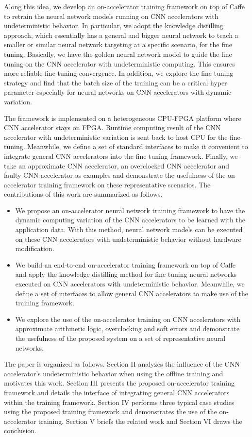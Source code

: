 Along this idea, we develop an on-accelerator training framework 
on top of Caffe to retrain the neural network models 
running on CNN accelerators with undeterministic behavior. 
In particular, we adopt the knowledge 
distilling approach, which essentially has a general and bigger
neural network to teach a smaller or similar neural network 
targeting at a specific scenario, for the fine tuning. 
Basically, we have the golden neural network model 
to guide the fine tuning on the CNN accelerator with undeterministic 
computing. This ensures more reliable fine tuning convergence.  
In addition, we explore the fine tuning strategy and find 
that the batch size of the training can be a critical hyper parameter 
especially for neural networks on CNN accelerators with dynamic variation. 

The framework is implemented on a heterogeneous CPU-FPGA platform where 
CNN accelerator stays on FPGA. Runtime computing result of the 
CNN accelerator with undeterministic variation is sent back to 
host CPU for the fine-tuning. Meanwhile, we define a set of standard 
interfaces to make it convenient to integrate general CNN accelerators 
into the fine tuning framework. Finally, we take an approximate CNN accelerator,
an overclocked CNN accelerator and faulty CNN accelerator as examples 
and demonstrate the usefulness of the on-accelerator training framework on 
these representative scenarios. The contributions of this work are 
summarized as follows.

\begin{itemize}
	\item We propose an on-accelerator neural network training framework to 
		have the dynamic computing variation of the CNN accelerators to be 
		learned with the application data. With this method, neural 
		network models can be executed on these CNN accelerators with 
		undeterministic behavior without hardware modification.

	\item We build an end-to-end on-accelerator training framework on top of Caffe
		and apply the knowledge distilling method for fine tuning neural networks 
		executed on CNN accelerators with undeterministic behavior. Meanwhile, we 
		define a set of interfaces to allow general CNN accelerators 
		to make use of the training framework.

	\item We explore the use of the on-accelerator training on CNN accelerators 
		with approximate arithmetic logic, overclocking and soft errors and 
		demonstrate the usefulness of the proposed system on a set of 
		representative neural networks.
\end{itemize}
The paper is organized as follows. Section II analyzes the influence of 
the CNN accelerator's undeterministic behavior when using the offline 
training and motivates this work. Section III presents the 
proposed on-accelerator training framework and 
details the interface of integrating general CNN accelerators within the 
training framework. Section IV performs three typical case studies using the 
proposed training framework and demonstrates the use of the on-accelerator 
training. Section V briefs the related work and Section VI draws the conclusion. 


